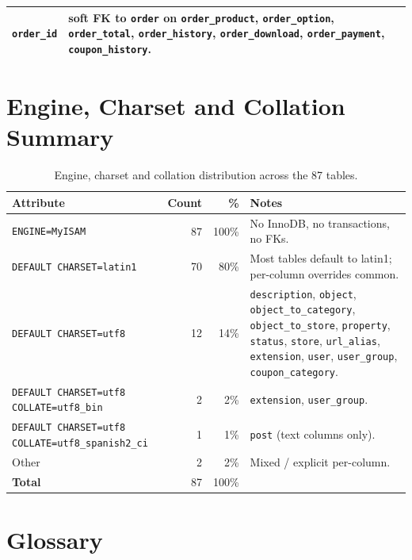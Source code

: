 \documentclass[11pt,a4paper]{article}
\begin{document}
\begin{table}[htbp]
\begin{tabularx}{\columnwidth}{>{\raggedright\arraybackslash}p{4.2cm}X}
\texttt{order\_id}                              & soft FK to \texttt{order} on \texttt{order\_product}, \texttt{order\_option}, \texttt{order\_total}, \texttt{order\_history}, \texttt{order\_download}, \texttt{order\_payment}, \texttt{coupon\_history}. \\
\bottomrule
\end{tabularx}
\end{table}

\section{Engine, Charset and Collation Summary}\label{app:engine}

\begin{table}[htbp]
\centering
\caption{Engine, charset and collation distribution across the 87 tables.}\label{tab:engine}
\small
\begin{tabularx}{\columnwidth}{lrrX}
\toprule
\textbf{Attribute} & \textbf{Count} & \textbf{\%} & \textbf{Notes} \\
\midrule
\texttt{ENGINE=MyISAM}            & 87 & 100\% & No InnoDB, no transactions, no FKs. \\
\texttt{DEFAULT CHARSET=latin1}   & 70 & 80\%  & Most tables default to latin1; per-column overrides common. \\
\texttt{DEFAULT CHARSET=utf8}     & 12 & 14\%  & \texttt{description}, \texttt{object}, \texttt{object\_to\_category}, \texttt{object\_to\_store}, \texttt{property}, \texttt{status}, \texttt{store}, \texttt{url\_alias}, \texttt{extension}, \texttt{user}, \texttt{user\_group}, \texttt{coupon\_category}. \\
\texttt{DEFAULT CHARSET=utf8 COLLATE=utf8\_bin} & 2 & 2\% & \texttt{extension}, \texttt{user\_group}. \\
\texttt{DEFAULT CHARSET=utf8 COLLATE=utf8\_spanish2\_ci} & 1 & 1\% & \texttt{post} (text columns only). \\
Other & 2 & 2\% & Mixed / explicit per-column. \\
\midrule
\textbf{Total}                    & 87 & 100\% & \\
\bottomrule
\end{tabularx}
\end{table}

\section{Glossary}\label{app:glossary}
\end{document}
